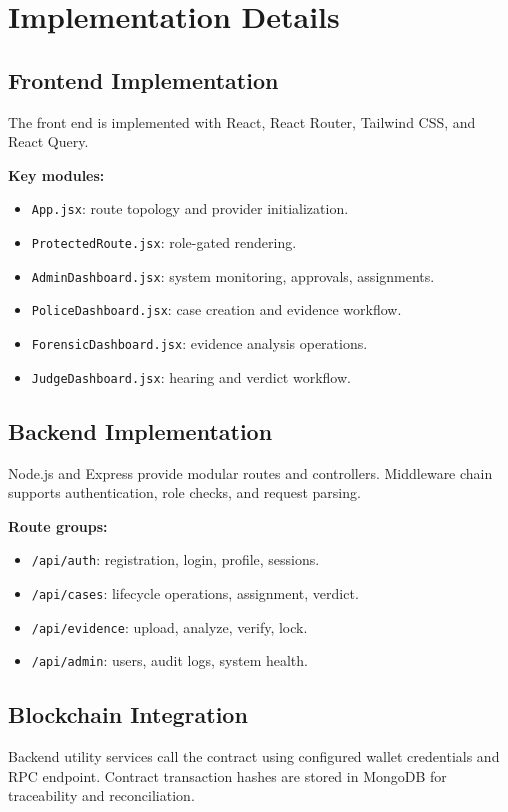 \documentclass[conference]{IEEEtran}
\begin{document}
\section{Implementation Details}
\subsection{Frontend Implementation}
The front end is implemented with React, React Router, Tailwind CSS, and React Query.

\textbf{Key modules:}
\begin{itemize}
    \item \texttt{App.jsx}: route topology and provider initialization.
    \item \texttt{ProtectedRoute.jsx}: role-gated rendering.
    \item \texttt{AdminDashboard.jsx}: system monitoring, approvals, assignments.
    \item \texttt{PoliceDashboard.jsx}: case creation and evidence workflow.
    \item \texttt{ForensicDashboard.jsx}: evidence analysis operations.
    \item \texttt{JudgeDashboard.jsx}: hearing and verdict workflow.
\end{itemize}

\subsection{Backend Implementation}
Node.js and Express provide modular routes and controllers. Middleware chain supports authentication, role checks, and request parsing.

\textbf{Route groups:}
\begin{itemize}
    \item \texttt{/api/auth}: registration, login, profile, sessions.
    \item \texttt{/api/cases}: lifecycle operations, assignment, verdict.
    \item \texttt{/api/evidence}: upload, analyze, verify, lock.
    \item \texttt{/api/admin}: users, audit logs, system health.
\end{itemize}

\subsection{Blockchain Integration}
Backend utility services call the contract using configured wallet credentials and RPC endpoint. Contract transaction hashes are stored in MongoDB for traceability and reconciliation.
\end{document}
